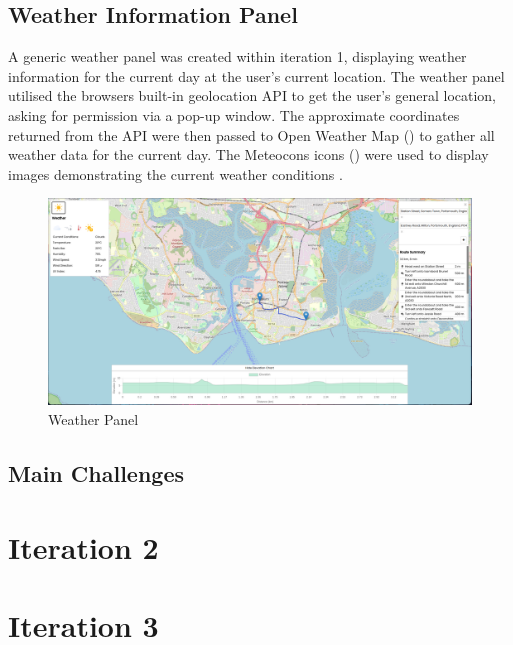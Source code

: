 \subsection{Weather Information Panel}
\label{iteration1:weather-panel}
A generic weather panel was created within iteration 1, displaying weather information for the current day at the user's current location. The weather panel utilised the browsers built-in geolocation API to get the user's general location, asking for permission via a pop-up window. The approximate coordinates returned from the API were then passed to Open Weather Map () to gather all weather data for the current day. The Meteocons icons () were used to display images demonstrating the current weather conditions .

\begin{figure}[!ht]
    \centering
    \includegraphics[width=425px]{figures/Progress Images/Iteration-1/SR19&SR28 Combined/SR19&SR28 Merged.png}
    \caption{Weather Panel}
    \label{fig:basic-weather-panel}
\end{figure}

\subsection{Main Challenges}
\label{iteration1:main-challenges}
\section{Iteration 2}
\label{implementation:iteration2}

\section{Iteration 3}
\label{implementation:iteration3}
